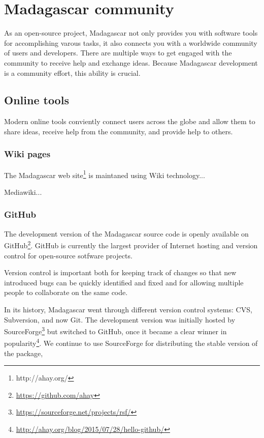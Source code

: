 \chapter{Madagascar community}

As an open-source project, Madagascar not only provides you with
software tools for accomplishing varous tasks, it also connects you
with a worldwide community of users and developers. There are multiple
ways to get engaged with the community to receive help and exchange
ideas. Because Madagascar development is a community effort, this
ability is crucial.

\section{Online tools}

Modern online tools conviently connect users across the globe and
allow them to share ideas, receive help from the community, and
provide help to others. 

\subsection{Wiki pages}

The Madagascar web site\footnote{http://ahay.org/} is maintaned using
Wiki technology...

Mediawiki...

\subsection{GitHub}

The development version of the Madagascar source code is openly
available on GitHub\footnote{\url{https://github.com/ahay}}. GitHub is currently
the largest provider of Internet hosting and version control for
open-source sotfware projects.

Version control is important both for keeping track of changes so that
new introduced bugs can be quickly identified and fixed and for
allowing multiple people to collaborate on the same code.

In its history, Madagascar went through different version control
systems: CVS, Subversion, and now Git. The development version was
initially hosted by
SourceForge\footnote{\url{https://sourceforge.net/projects/rsf/}} but
switched to GitHub, once it became a clear winner in
popularity\footnote{\url{http://ahay.org/blog/2015/07/28/hello-github/}}. We
continue to use SourceForge for distributing the stable version of the
package,

